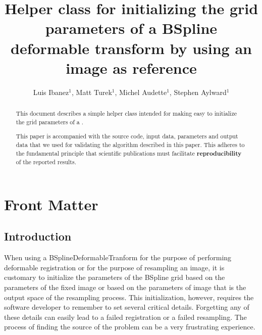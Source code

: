 \documentclass{InsightArticle}
\title{Helper class for initializing the grid parameters of a BSpline
deformable transform by using an image as reference}
\author{Luis Ibanez$^{1}$, Matt Turek$^{1}$, Michel Audette$^{1}$, Stephen Aylward$^{1}$}
\begin{document}
%
%

\ifpdf
\else
\fi


\maketitle

\ifhtml
\chapter*{Front Matter\label{front}}
\fi


\begin{abstract}
\noindent
This document describes a simple helper class intended for making easy to
initialize the grid parameters of a .

This paper is accompanied with the source code, input data, parameters and
output data that we used for validating the algorithm described in this paper.
This adheres to the fundamental principle that scientific publications must
facilitate \textbf{reproducibility} of the reported results.
\end{abstract}

\tableofcontents

\section{Introduction}

When using a BSplineDeformableTranform for the purpose of performing deformable
registration or for the purpose of resampling an image, it is customary to
initialize the parameters of the BSpline grid based on the parameters of the
fixed image or based on the parameters of image that is the output space of the
resampling process. This initialization, however, requires the software
developer to remember to set several critical details. Forgetting any of these
details can easily lead to a failed registration or a failed resampling. The
process of finding the source of the problem can be a very frustrating
experience.
\end{document}
